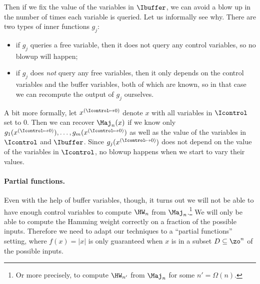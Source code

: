 
Then if we fix the value of the variables in $\Ibuffer$, we can avoid a blow up in the number of times each variable is queried.
Let us informally see why.
There are two types of inner functions $g_j$:
\begin{itemize}
    \item if $g_j$ queries a free variable, then it does not query any control variables, so no blowup will happen;
    \item if $g_j$ does \emph{not} query any free variables, then it only depends on the control variables and the buffer variables, both of which are known, so in that case we can recompute the output of $g_j$ ourselves.
\end{itemize}
A bit more formally, let $x^{(\Icontrol \mapsto 0)}$ denote $x$ with all variables in $\Icontrol$ set to $0$.
Then we can recover $\Maj_n(x)$ if we know only $g_1(x^{(\Icontrol \mapsto 0)}), \ldots, g_m(x^{(\Icontrol \mapsto 0)})$ as well as the value of the variables in $\Icontrol$ and $\Ibuffer$.
Since $g_j(x^{(\Icontrol \mapsto 0)})$ does not depend on the value of the variables in $\Icontrol$, no blowup happens when we start to vary their values.

\paragraph*{Partial functions.}
Even with the help of buffer variables, though, it turns out we will not be able to have enough control variables to compute $\HW_n$ from $\Maj_n$.\footnote{Or more precisely, to compute $\HW_{n'}$ from $\Maj_n$ for some $n' = \Omega(n)$.}
We will only be able to compute the Hamming weight correctly on a fraction of the possible inputs.
Therefore we need to adapt our techniques  to a ``partial functions'' setting, where $f(x) = |x|$ is only guaranteed when $x$ is in a subset $D \subseteq \zo^n$ of the possible inputs.

